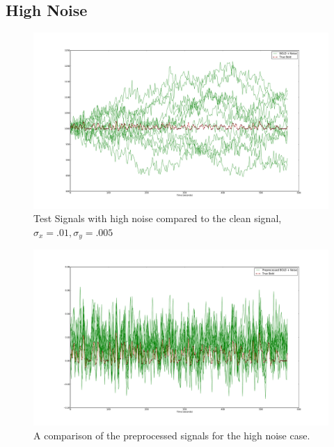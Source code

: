 \subsection{High Noise}
\label{sec:HighNoise}
\begin{figure}
\includegraphics[clip=true,trim=6cm 2cm 6cm 3.5cm,width=17cm]{images/realization_highnoise}
\caption{Test Signals with high noise compared to the clean signal, $\sigma_x = .01, \sigma_y=.005$}
\label{fig:HighNoiseRealization}
\end{figure}
\begin{figure}
\includegraphics[clip=true,trim=6cm 2cm 6cm 3.5cm,width=17cm]{images/preprocessed_highnoise}
\caption{A comparison of the preprocessed signals for the high noise case.}
\label{fig:PreprocessedHighNoise}
\end{figure}
